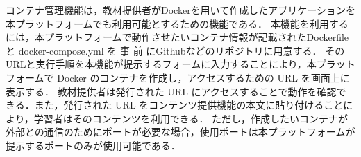 コンテナ管理機能は，教材提供者がDockerを用いて作成したアプリケーションを本プラットフォームでも利用可能とするための機能である．
本機能を利用するには，本プラットフォームで動作させたいコンテナ情報が記載されたDockerfile と docker-compose.yml を 事 前 にGithubなどのリポジトリに用意する．
そのURLと実行手順を本機能が提示するフォームに入力することにより，本プラットフォームで Docker のコンテナを作成し，アクセスするための URL を画面上に表示する．
教材提供者は発行された URL にアクセスすることで動作を確認できる．また，発行された URL をコンテンツ提供機能の本文に貼り付けることにより，学習者はそのコンテンツを利用できる．
ただし，作成したいコンテナが外部との通信のためにポートが必要な場合，使用ポートは本プラットフォームが提示するポートのみが使用可能である．